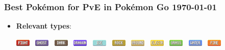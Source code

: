 \documentclass[12pt]{beamer}
\begin{document}
\begin{frame}
\frametitle{Best Pok\'emon for PvE in Pok\'emon Go \hspace{3.3cm} \today}

\begin{block}{}
\begin{footnotesize}

\begin{itemize}
  \item \textbf{Relevant types}: 
  
  \begin{center}
  \includegraphics[height=0.3cm]{../../images/type/full/Fighting.png}~
  \includegraphics[height=0.3cm]{../../images/type/full/Ghost}~
  \includegraphics[height=0.3cm]{../../images/type/full/Dark}~
  \includegraphics[height=0.3cm]{../../images/type/full/Dragon}~
  \includegraphics[height=0.3cm]{../../images/type/full/Ice}~
  \includegraphics[height=0.3cm]{../../images/type/full/Rock}~
  \includegraphics[height=0.3cm]{../../images/type/full/Ground}~
  \includegraphics[height=0.3cm]{../../images/type/full/Electric}~
  \includegraphics[height=0.3cm]{../../images/type/full/Grass}~
  \includegraphics[height=0.3cm]{../../images/type/full/Water}~
  \includegraphics[height=0.3cm]{../../images/type/full/Fire}~

\end{center}
\end{itemize}
\end{footnotesize}
\end{block}
\end{frame}
\end{document}
